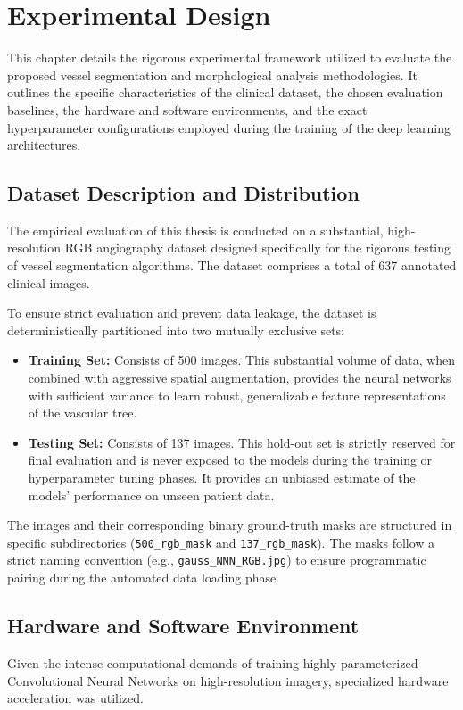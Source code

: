 \chapter{Experimental Design}
\label{ch:experimental_design}

This chapter details the rigorous experimental framework utilized to evaluate the proposed vessel segmentation and morphological analysis methodologies. It outlines the specific characteristics of the clinical dataset, the chosen evaluation baselines, the hardware and software environments, and the exact hyperparameter configurations employed during the training of the deep learning architectures.

\section{Dataset Description and Distribution}
The empirical evaluation of this thesis is conducted on a substantial, high-resolution RGB angiography dataset designed specifically for the rigorous testing of vessel segmentation algorithms. The dataset comprises a total of 637 annotated clinical images.

To ensure strict evaluation and prevent data leakage, the dataset is deterministically partitioned into two mutually exclusive sets:
\begin{itemize}
    \item \textbf{Training Set:} Consists of 500 images. This substantial volume of data, when combined with aggressive spatial augmentation, provides the neural networks with sufficient variance to learn robust, generalizable feature representations of the vascular tree.
    \item \textbf{Testing Set:} Consists of 137 images. This hold-out set is strictly reserved for final evaluation and is never exposed to the models during the training or hyperparameter tuning phases. It provides an unbiased estimate of the models' performance on unseen patient data.
\end{itemize}

The images and their corresponding binary ground-truth masks are structured in specific subdirectories (\texttt{500\_rgb\_mask} and \texttt{137\_rgb\_mask}). The masks follow a strict naming convention (e.g., \texttt{gauss\_NNN\_RGB.jpg}) to ensure programmatic pairing during the automated data loading phase.

\section{Hardware and Software Environment}
Given the intense computational demands of training highly parameterized Convolutional Neural Networks on high-resolution imagery, specialized hardware acceleration was utilized. 

